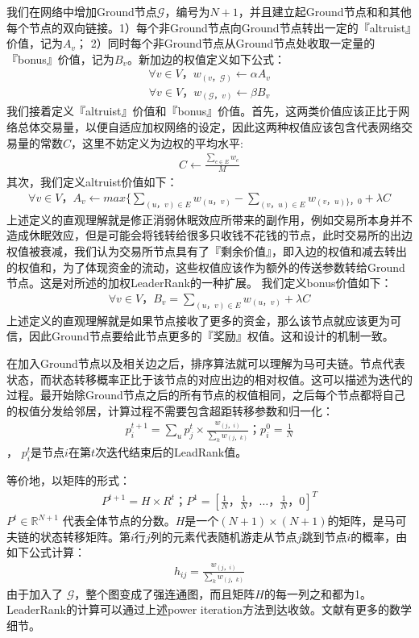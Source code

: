 我们在网络中增加Ground节点$\mathcal{G}$，编号为$N+1$，并且建立起Ground节点和和其他每个节点的双向链接。1）每个非Ground节点向Ground节点转出一定的『altruist』价值，记为$A_v$； 2）同时每个非Ground节点从Ground节点处收取一定量的『bonus』价值，记为$B_v$。新加边的权值定义如下公式：
\begin{align}\label{formula:weight1}
	\forall v \in V， w_{(v， \mathcal{G})} \leftarrow \alpha A_v
\end{align}
\begin{align}\label{formula:weight2}
\forall v \in V， w_{(\mathcal{G}， v)} \leftarrow \beta B_v
\end{align}
我们接着定义『altruist』价值和『bonus』价值。首先，这两类价值应该正比于网络总体交易量，以便自适应加权网络的设定，因此这两种权值应该包含代表网络交易量的常数$C$，这里不妨定义为边权的平均水平:
\begin{align}
	C \leftarrow \frac{\sum_{e \in E} w_e}{M}
\end{align}
其次，我们定义altruist价值如下：
\begin{align}
	\forall v \in V， A_v \leftarrow max\{ \sum_{(u，v)\in E} w_{(u，v)} - \sum_{(v，u) \in E} w_{(v，u) \}， 0 } + \lambda C
\end{align}
上述定义的直观理解就是修正消弱休眠效应所带来的副作用，例如交易所本身并不造成休眠效应，但是可能会将钱转给很多只收钱不花钱的节点，此时交易所的出边权值被衰减，我们认为交易所节点具有了『剩余价值』，即入边的权值和减去转出的权值和，为了体现资金的流动，这些权值应该作为额外的传送参数转给Ground节点。这是对\textcite{Li2014}所述的加权LeaderRank的一种扩展。
我们定义bonus价值如下：
\begin{align}
\forall v \in V， B_v =  \sum_{(u，v) \in E} w_{(u，v)} + \lambda C
\end{align}
上述定义的直观理解就是如果节点接收了更多的资金，那么该节点就应该更为可信，因此Ground节点要给此节点更多的『奖励』权值。这和\textcite{Li2014}设计的机制一致。

在加入Ground节点以及相关边之后，排序算法就可以理解为马可夫链。节点代表状态，而状态转移概率正比于该节点的对应出边的相对权值。这可以描述为迭代的过程。最开始除Ground节点之后的所有节点的权值相同，之后每个节点都将自己的权值分发给邻居，计算过程不需要包含超距转移参数和归一化：
\begin{align}
	p_i^{t+1} = \sum_u p_j^t \times \frac{ w_{(j，i)} }{ \sum_k w_{(j，k)} }； p_i^0 = \frac{1}{N}
\end{align}
， $p_i^t$是节点$i$在第$t$次迭代结束后的LeadRank值。

等价地，以矩阵的形式：
\begin{align}
	P^{t+1} = H \times R^{t}； P^1=[\frac{1}{N}， \frac{1}{N}， \dots， \frac{1}{N}， 0]^T
\end{align}
$P^t \in \mathbb{R}^{N+1}$ 代表全体节点的分数。$H$是一个$(N+1)\times (N+1)$的矩阵，是马可夫链的状态转移矩阵。第$i$行$j$列的元素代表随机游走从节点$j$跳到节点$i$的概率，由如下公式计算：
\begin{align}
h_{ij} = \frac{w_{(j，i)}}{\sum_k w_{(j，k)}}
\end{align}
由于加入了 $\mathcal{G}$，整个图变成了强连通图，而且矩阵$H$的每一列之和都为1。LeaderRank的计算可以通过上述power iteration方法到达收敛。文献\cite{Li2014}\cite{Chen2013}有更多的数学细节。

